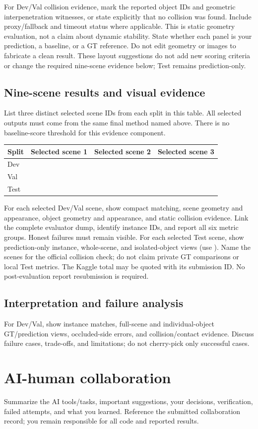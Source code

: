 \documentclass[11pt]{article}
\begin{document}
For Dev/Val collision evidence, mark the reported object IDs and geometric
interpenetration witnesses, or state explicitly that no collision was found.
Include proxy/fallback and timeout status where applicable. This is static
geometry evaluation, not a claim about dynamic stability. State whether each
panel is your prediction, a baseline, or a GT reference. Do not edit geometry
or images to fabricate a clean result.
These layout suggestions do not add new scoring criteria or change the
required nine-scene evidence below; Test remains prediction-only.
\subsection{Nine-scene results and visual evidence}
List three distinct selected scene IDs from each split in this table. All
selected outputs must come from the same final method named above. There is
no baseline-score threshold for this evidence component.
\begin{center}
\begin{tabular}{llll}\toprule
Split & Selected scene 1 & Selected scene 2 & Selected scene 3 \\
\midrule
Dev & & & \\
Val & & & \\
Test & & & \\
\bottomrule\end{tabular}
\end{center}
For each selected Dev/Val scene, show compact matching, scene geometry and
appearance, object geometry and appearance, and static collision evidence.
Link the complete evaluator dump, identify instance IDs, and report all six
metric groups. Honest failures must remain visible.
For each selected Test scene, show prediction-only instance, whole-scene,
and isolated-object views (use ). Name the scenes for
the official collision check; do not claim private GT comparisons or local
Test metrics. The Kaggle total may be quoted with its submission ID. No post-evaluation report
resubmission is required.
\subsection{Interpretation and failure analysis}
For Dev/Val, show instance matches, full-scene and individual-object GT/prediction views,
occluded-side errors, and collision/contact evidence. Discuss failure
cases, trade-offs, and limitations; do not cherry-pick only successful cases.
\section{AI-human collaboration}
Summarize the AI tools/tasks, important suggestions, your decisions, verification,
failed attempts, and what you learned. Reference the submitted collaboration
record; you remain responsible for all code and reported results.
\end{document}
